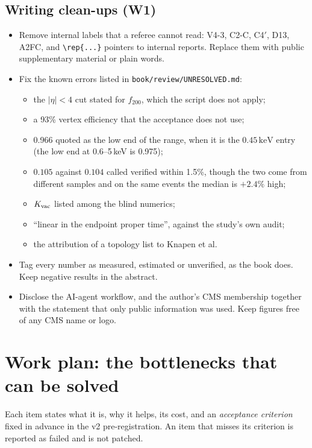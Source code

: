 \documentclass[11pt,a4paper]{article}
\newcommand{\keV}{\,\mathrm{keV}}
\begin{document}
\subsection{Writing clean-ups (W1)}
\begin{itemize}
  \item Remove internal labels that a referee cannot read: V4-3, C2-C, C4$'$, D13, A2FC, and \verb|\rep{...}| pointers to
        internal reports. Replace them with public supplementary material or plain words.
  \item Fix the known errors listed in \texttt{book/review/UNRESOLVED.md}:
    \begin{itemize}
      \item the $|\eta|<4$ cut stated for $f_{200}$, which the script does not apply;
      \item a 93\% vertex efficiency that the acceptance does not use;
      \item 0.966 quoted as the low end of the range, when it is the $0.45\keV$ entry (the low end at 0.6--5\,keV is 0.975);
      \item $0.105$ against $0.104$ called verified within 1.5\%, though the two come from different samples and on the
            same events the median is $+2.4\%$ high;
      \item $K_{\rm vac}$ listed among the blind numerics;
      \item ``linear in the endpoint proper time'', against the study's own audit;
      \item the attribution of a topology list to Knapen et al.
    \end{itemize}
  \item Tag every number as measured, estimated or unverified, as the book does. Keep negative results in the abstract.
  \item Disclose the AI-agent workflow, and the author's CMS membership together with the statement that only public
        information was used. Keep figures free of any CMS name or logo.
\end{itemize}

\section{Work plan: the bottlenecks that can be solved}\label{sec:work}

Each item states what it is, why it helps, its cost, and an \emph{acceptance criterion} fixed in advance in the v2
pre-registration. An item that misses its criterion is reported as failed and is not patched.
\end{document}
